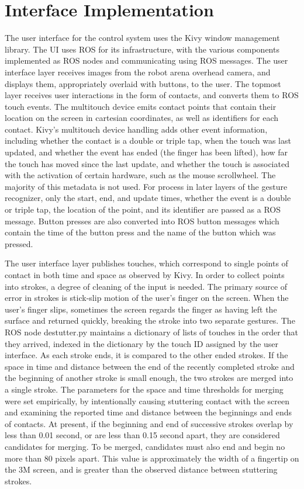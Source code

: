 \chapter{Interface Implementation}
\thispagestyle{fancy}



The user interface for the control system uses the Kivy window management library. 
The UI uses ROS for its infrastructure, with the various components implemented as ROS nodes and communicating using ROS messages.
The user interface layer receives images from the robot arena overhead camera, and displays them, appropriately overlaid with buttons, to the user. 
The topmost layer receives user interactions in the form of contacts, and converts them to ROS touch events. The multitouch device emits contact points that contain their location on the screen in cartesian coordinates, as well as identifiers for each contact.
Kivy's multitouch device handling adds other event information, including whether the contact is a double or triple tap, when the touch was last updated, and whether the event has ended (the finger has been lifted), how far the touch has moved since the last update, and whether the touch is associated with the activation of certain hardware, such as the mouse scrollwheel.
The majority of this metadata is not used. 
For process in later layers of the gesture recognizer, only the start, end, and update times, whether the event is a double or triple tap, the location of the point, and its identifier are passed as a ROS message. 
Button presses are also converted into ROS button messages which contain the time of the button press and the name of the button which was pressed. 

The user interface layer publishes touches, which correspond to single points of contact in both time and space as observed by Kivy. 
In order to collect points into strokes, a degree of cleaning of the input is needed. 
The primary source of error in strokes is stick-slip motion of the user's finger on the screen. 
When the user's finger slips, sometimes the screen regards the finger as having left the surface and returned quickly, breaking the stroke into two separate gestures. 
The ROS node destutter.py maintains a dictionary of lists of touches in the order that they arrived, indexed in the dictionary by the touch ID assigned by the user interface. 
As each stroke ends, it is compared to the other ended strokes. 
If the space in time and distance between the end of the recently completed stroke and the beginning of another stroke is small enough, the two strokes are merged into a single stroke. 
The parameters for the space and time thresholds for merging were set empirically, by intentionally causing stuttering contact with the screen and examining the reported time and distance between the beginnings and ends of contacts. 
At present, if the beginning and end of successive strokes overlap by less than 0.01 second, or are less than 0.15 second apart, they are considered candidates for merging. 
To be merged, candidates must also end and begin no more than 80 pixels apart. 
This value is approximately the width of a fingertip on the 3M screen, and is greater than the observed distance between stuttering strokes. 

